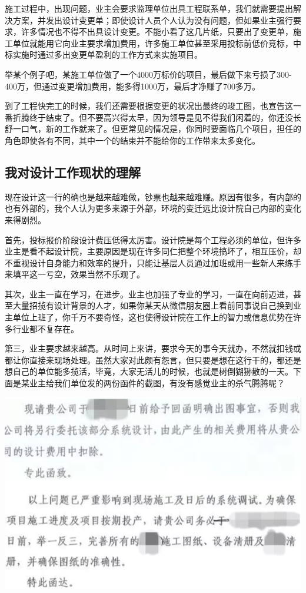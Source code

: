 \documentclass[
]{book}
\begin{document}
施工过程中，出现问题，业主会要求监理单位出具工程联系单，我们就需要提出解决方案，并发出设计变更单；即使设计人员个人认为没有问题，但如果业主强行要求，许多情况也不得不出具设计变更。不能小看了这几片纸，只要出了变更单，施工单位就能用它向业主要求增加费用，许多施工单位甚至采用投标前低价竞标，中标实施时通过多出变更单盈利的工作方式来实施项目。

举某个例子吧，某施工单位做了一个4000万标价的项目，最后做下来亏损了300-400万，但通过变更增加费用，能多得1000万，最后才净赚了700多万。

到了工程快完工的时候，我们还需要根据变更的状况出最终的竣工图，也宣告这一番折腾终于结束了。但不要高兴得太早，因为领导是见不得我们闲着的，你还没长舒一口气，新的工作就来了。但更常见的情况是，你同时要面临几个项目，担任的角色即使各有不同，其中一个的结束并不能给你的工作带来太多变化。

\hypertarget{ux6211ux5bf9ux8bbeux8ba1ux5de5ux4f5cux73b0ux72b6ux7684ux7406ux89e3}{%
\subsection{我对设计工作现状的理解}\label{ux6211ux5bf9ux8bbeux8ba1ux5de5ux4f5cux73b0ux72b6ux7684ux7406ux89e3}}

现在设计这一行的确也是越来越难做，钞票也越来越难赚。原因有很多，有内部的也有外部的，我个人认为更多来源于外部，环境的变迁远比设计院自己内部的变化来得剧烈。

首先，投标报价阶段设计费压低得太厉害。设计院是每个工程必须的单位，但许多业主是看不起设计院，主要原因是现在许多同仁把整个环境搞坏了，相互压价，却不重视设计自身能力和效率的提升，只能让基层人员通过加班或用一些新人来练手来填平这一亏空，效果当然不乐观了。

其次，业主一直在学习，在进步。业主也加强了专业的学习，一直在向前迈进，甚至大量招揽有设计背景的人才，如果你某天从微信朋友圈上看前同事说自己换到业主单位上班了，你千万不要奇怪，这也使得设计院在工作上的智力或信息优势在许多行业都不复存在。

第三，业主要求越来越高。从时间上来讲，要求今天的事今天就办，不然就扣钱或都让你直接来现场处理。虽然大家对此颇有怨言，但只要是想在这行干的，都还是想自己的单位能多揽活，毕竟，大家无活儿的时候，也就是树倒猢狲散的一天。下面是某业主给我们单位发的两份函件的截图，有没有感觉业主的杀气腾腾呢？

\includegraphics[width=8.33in]{images/sisi4}
\end{document}
